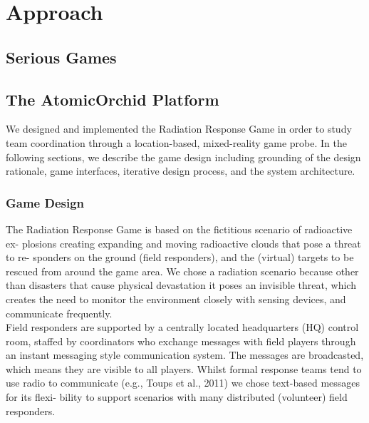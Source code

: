 \chapter{Approach}\label{ch:approach}



\section{Serious Games}

\section{The AtomicOrchid Platform}
We designed and implemented the Radiation Response Game in order to study team coordination through a location-based, mixed-reality game probe. In the following sections, we describe the game design including grounding of the design rationale, game interfaces, iterative design process, and the system architecture.

\subsection{Game Design}
The Radiation Response Game is based on the fictitious scenario of radioactive ex- plosions creating expanding and moving radioactive clouds that pose a threat to re- sponders on the ground (field responders), and the (virtual) targets to be rescued from around the game area. We chose a radiation scenario because other than disasters that cause physical devastation it poses an invisible threat, which creates the need to monitor the environment closely with sensing devices, and communicate frequently.\\

Field responders are supported by a centrally located headquarters (HQ) control room, staffed by coordinators who exchange messages with field players through an instant messaging style communication system. The messages are broadcasted, which means they are visible to all players. Whilst formal response teams tend to use radio to communicate (e.g., Toups et al., 2011) we chose text-based messages for its flexi- bility to support scenarios with many distributed (volunteer) field responders.\\

